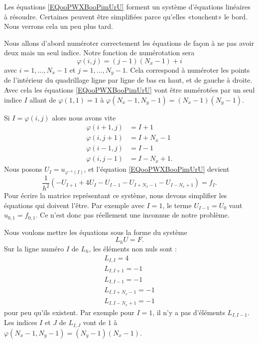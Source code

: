 Les équations \eqref{EQooPWXBooPimUrU} forment un système d'équations linéaires à résoudre. Certaines peuvent être simplifiées parce qu'elles «touchent» le bord. Nous verrons cela un peu plus tard.

Nous allons d'abord numéroter correctement les équations de façon à ne pas avoir deux mais un seul indice. Notre fonction de numérotation sera
\begin{equation}
	\varphi(i,j)=(j-1)(N_x-1)+i
\end{equation}
avec \( i=1,\ldots, N_x-1\) et \( j=1,\ldots, N_y-1\). Cela correspond à numéroter les points de l'intérieur du quadrillage ligne par ligne de bas en haut, et de gauche à droite. Avec cela les équations \eqref{EQooPWXBooPimUrU} vont être numérotées par un seul indice \( I\) allant de \( \varphi(1,1)=1\) à \( \varphi(N_x-1,N_y-1)=(N_x-1)(N_y-1)\).

Si \( I=\varphi(i,j)\) alors nous avons vite
\begin{subequations}
	\begin{align}
		\varphi(i+1,j) & =I+1      \\
		\varphi(i,j+1) & =I+N_x-1  \\
		\varphi(i-1,j) & =I-1      \\
		\varphi(i,j-1) & =I-N_x+1.
	\end{align}
\end{subequations}
Nous posons \( U_I=u_{\varphi^{-1}(I)}\), et l'équation \eqref{EQooPWXBooPimUrU} devient
\begin{equation}
	\frac{1}{ h^2 }(-U_{I+1}+4U_I-U_{I-1}-U_{I+N_x-1}-U_{I-N_x+1})=f_I.
\end{equation}
Pour écrire la matrice représentant ce système, nous devons simplifier les équations qui doivent l'être. Par exemple avec \( I=1\), le terme \( U_{I-1}=U_0\) vaut \( u_{0,1}=f_{0,1}\). Ce n'est donc pas réellement une inconnue de notre problème.

Nous voulons mettre les équations sous la forme du système
\begin{equation}
	L_hU=F.
\end{equation}
Sur la ligne numéro \( I\) de \( L_h\), les éléments non nuls sont :
\begin{subequations}        \label{SUBEQQooSRQNooYrCNhj}
	\begin{align}
		L_{I,I}=4        \\
		L_{I,I+1}=-1     \\
		L_{I,I-1}=-1     \\
		L_{I,I+N_x-1}=-1 \\
		L_{I,I-N_x+1}=-1
	\end{align}
\end{subequations}
pour peu qu'ils existent. Par exemple pour \( I=1\), il n'y a pas d'éléments \( L_{I,I-1}\). Les indices \( I\) et \( J\) de \( L_{I,J}\) vont de \( 1\) à \( \varphi(N_x-1,N_y-1)=(N_y-1)(N_x-1)\).

